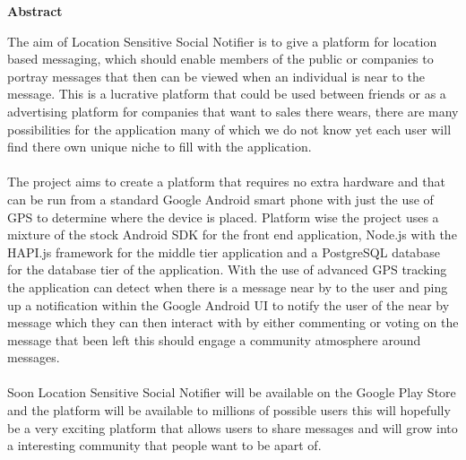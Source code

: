 \thispagestyle{empty}

\begin{center}
    {\LARGE\bf Abstract}
\end{center}

\noindent
The aim of Location Sensitive Social Notifier is to give a platform for location based messaging, which should enable members of the public or companies to portray messages that then can be viewed when an individual is near to the message. This is a lucrative platform that could be used between friends or as a advertising platform for companies that want to sales there wears, there are many possibilities for the application many of which we do not know yet each user will find there own unique niche to fill with the application.\\
\\
The project aims to create a platform that requires no extra hardware and that can be run from a standard Google Android smart phone with just the use of GPS to determine where the device is placed. Platform wise the project uses a mixture of the stock Android SDK \cite{Google:androidAPIDocs:2015:online} for the front end application, Node.js\cite{nodeteam:node:2015:online} with the HAPI.js\cite{hapiteam:hapti:2015:online} framework for the middle tier application and a PostgreSQL\cite{Postgres:APIDocumentation:2015:online} database for the database tier of the application. With the use of advanced GPS tracking the application can detect when there is a message near by to the user and ping up a notification within the Google Android UI to notify the user of the near by message which they can then interact with by either commenting or voting on the message that been left this should engage a community atmosphere around messages.\\ 
\\
Soon Location Sensitive Social Notifier will be available on the Google Play Store and the platform will be available to millions of possible users this will hopefully be a very exciting platform that allows users to share messages and will grow into a interesting community that people want to be apart of.